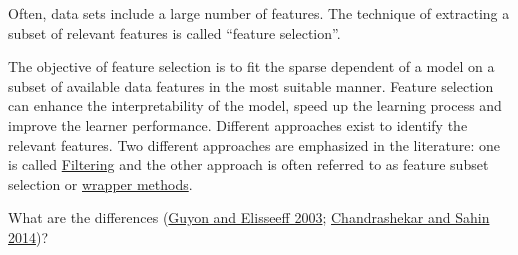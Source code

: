 \documentclass[
]{scrbook}
\begin{document}
Often, data sets include a large number of features.
The technique of extracting a subset of relevant features is called ``feature selection''.

The objective of feature selection is to fit the sparse dependent of a model on a subset of available data features in the most suitable manner.
Feature selection can enhance the interpretability of the model, speed up the learning process and improve the learner performance.
Different approaches exist to identify the relevant features.
Two different approaches are emphasized in the literature:
one is called \protect\hyperlink{fs-filter}{Filtering} and the other approach is often referred to as feature subset selection or \protect\hyperlink{fs-wrapper}{wrapper methods}.

What are the differences (\protect\hyperlink{ref-guyon2003}{Guyon and Elisseeff 2003}; \protect\hyperlink{ref-chandrashekar2014}{Chandrashekar and Sahin 2014})?
\end{document}
